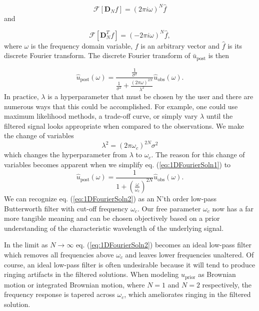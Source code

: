 \documentclass[10pt,a4paper]{article}
\begin{document}
\begin{equation}\label{eq:Property1}
  \mathcal{F}[\mathbf{D}_Nf] = (2\pi i\omega)^N \hat{f}
\end{equation}
and

\begin{equation}\label{eq:Property2}
  \mathcal{F}[\mathbf{D}^T_Nf] = (-2\pi i\omega)^N \hat{f},
\end{equation}
where $\omega$ is the frequency domain variable, $f$ is an arbitrary vector and $\hat{f}$ is its discrete Fourier transform.  The discrete Fourier transform of $\bar{u}_\mathrm{post}$ is then

\begin{equation}\label{eq:1DFourierSoln1}
\hat{u}_\mathrm{post}(\omega) = \frac{\frac{1}{\sigma^2}}
                                  {\frac{1}{\sigma^2} +                  
                                  \frac{(2\pi\omega)^{2N}}{\lambda^2}}
                                  \hat{u}_\mathrm{obs}(\omega).
\end{equation}
In practice, $\lambda$ is a hyperparameter that must be chosen by the user and there are numerous ways that this could be accomplished.  For example, one could use maximum likelihood methods, a trade-off curve, or simply vary $\lambda$ until the filtered signal looks appropriate when compared to the observations.  We make the change of variables 
\begin{equation}\label{eq:VariableChange}
\lambda^2 = (2\pi\omega_c)^{2N}\sigma^2
\end{equation}
which changes the hyperparameter from $\lambda$ to $\omega_c$.  The reason for this change of variables becomes apparent when we simplify eq. (\ref{eq:1DFourierSoln1}) to
\begin{equation}\label{eq:1DFourierSoln2}
\hat{u}_\mathrm{post}(\omega) = \frac{1}
                                  {1 + \left(\frac{\omega}{\omega_c}\right)^{2N}}
                                  \hat{u}_\mathrm{obs}(\omega).        
\end{equation}
We can recognize eq. (\ref{eq:1DFourierSoln2}) as an N'th order low-pass Butterworth filter with cut-off frequency $\omega_c$.  Our free parameter $\omega_c$ now has a far more tangible meaning and can be chosen objectively based on a prior understanding of the characteristic wavelength of the underlying signal.  

In the limit as $N\to \infty$ eq. (\ref{eq:1DFourierSoln2}) becomes an ideal low-pass filter which removes all frequencies above $\omega_c$ and leaves lower frequencies unaltered.  Of course, an ideal low-pass filter is often undesirable because it will tend to produce ringing artifacts in the filtered solutions.  When modeling $u_\mathrm{prior}$ as Brownian motion or integrated Brownian motion, where $N=1$ and $N=2$ respectively, the frequency response is tapered across $\omega_c$, which ameliorates ringing in the filtered solution.
\end{document}
